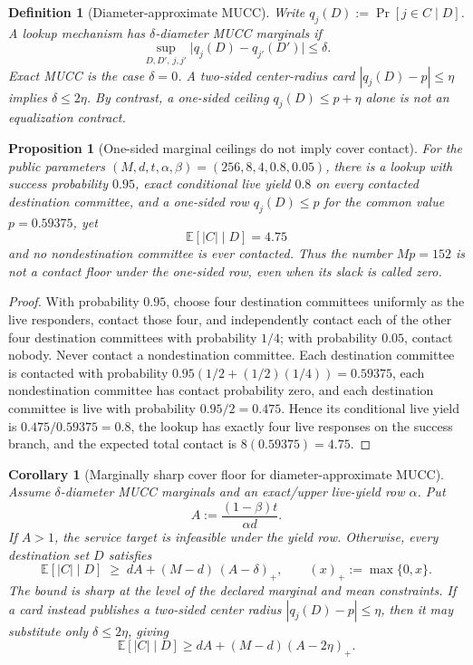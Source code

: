 \documentclass[11pt]{article}
\newtheorem{definition}{Definition}
\newtheorem{corollary}{Corollary}
\newtheorem{proposition}{Proposition}
\newcommand{\E}{\mathbb{E}}
\begin{document}
\begin{definition}[Diameter-approximate MUCC]
\label{def:diameter-approx-mucc}
Write $q_j(D):=\Pr[j\in C\mid D]$.  A lookup mechanism has \emph{$\delta$-diameter MUCC marginals} if
\[
\sup_{D,D',\,j,j'}\bigl|q_j(D)-q_{j'}(D')\bigr|\le\delta.
\]
Exact MUCC is the case $\delta=0$.  A two-sided center-radius card
$|q_j(D)-p|\le\eta$ implies $\delta\le2\eta$.  By contrast, a one-sided ceiling
$q_j(D)\le p+\eta$ alone is not an equalization contract.
\end{definition}

\begin{proposition}[One-sided marginal ceilings do not imply cover contact]
\label{prop:one-sided-mucc-counterexample}
For the public parameters $(M,d,t,\alpha,\beta)=(256,8,4,0.8,0.05)$, there is a lookup with success probability $0.95$, exact conditional live yield $0.8$ on every contacted destination committee, and a one-sided row
$q_j(D)\le p$ for the common value $p=0.59375$, yet
\[
\E[|C|\mid D]=4.75
\]
and no nondestination committee is ever contacted.  Thus the number $Mp=152$ is not a contact floor under the one-sided row, even when its slack is called zero.
\end{proposition}

\begin{proof}
With probability $0.95$, choose four destination committees uniformly as the live responders, contact those four, and independently contact each of the other four destination committees with probability $1/4$; with probability $0.05$, contact nobody.  Never contact a nondestination committee.  Each destination committee is contacted with probability
$0.95(1/2+(1/2)(1/4))=0.59375$, each nondestination committee has contact probability zero, and each destination committee is live with probability $0.95/2=0.475$.  Hence its conditional live yield is $0.475/0.59375=0.8$, the lookup has exactly four live responses on the success branch, and the expected total contact is $8(0.59375)=4.75$.
\end{proof}

\begin{corollary}[Marginally sharp cover floor for diameter-approximate MUCC]
\label{cor:approx-mucc}
Assume $\delta$-diameter MUCC marginals and an exact/upper live-yield row $\alpha$.
Put
\[
A:=\frac{(1-\beta)t}{\alpha d}.
\]
If $A>1$, the service target is infeasible under the yield row.  Otherwise, every destination set $D$ satisfies
\[
\E[|C|\mid D]
\;\ge\;
 dA+(M-d)\,(A-\delta)_+,
\qquad (x)_+:=\max\{0,x\}.
\]
The bound is sharp at the level of the declared marginal and mean constraints.  If a card instead publishes a two-sided center radius $|q_j(D)-p|\le\eta$, then it may substitute only $\delta\le2\eta$, giving
\[
\E[|C|\mid D]\ge dA+(M-d)(A-2\eta)_+.
\]
\end{corollary}
\end{document}
